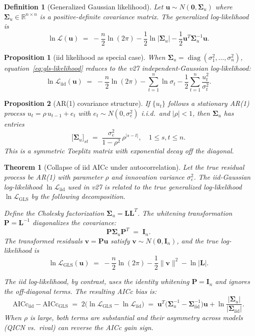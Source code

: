 \documentclass[11pt]{article}
\newtheorem{definition}{Definition}
\newtheorem{proposition}{Proposition}
\newtheorem{theorem}{Theorem}
\begin{document}
\begin{definition}[Generalized Gaussian likelihood]
Let $\bm{u}\sim N(\bm{0},\bm{\Sigma}_u)$ where $\bm{\Sigma}_u\in\mathbb{R}^{n\times n}$ is a positive-definite covariance matrix. The \emph{generalized log-likelihood} is
\begin{equation}\label{eq:gls-likelihood}
\ln\mathcal{L}(\bm{u})\;=\;-\frac{n}{2}\ln(2\pi)-\frac{1}{2}\ln|\bm{\Sigma}_u|-\frac{1}{2}\bm{u}^T\bm{\Sigma}_u^{-1}\bm{u}.
\end{equation}
\end{definition}

\begin{proposition}[iid likelihood as special case]
When $\bm{\Sigma}_u=\operatorname{diag}(\sigma_1^2,\ldots,\sigma_n^2)$, equation~\eqref{eq:gls-likelihood} reduces to the v27 independent-Gaussian log-likelihood:
\[
\ln\mathcal{L}_{\mathrm{iid}}(\bm{u})\;=\;-\frac{n}{2}\ln(2\pi)-\sum_{t=1}^n\ln\sigma_t-\frac{1}{2}\sum_{t=1}^n\frac{u_t^2}{\sigma_t^2}.
\]
\end{proposition}

\begin{proposition}[AR(1) covariance structure]\label{prop:ar1-cov}
If $\{u_t\}$ follows a stationary AR(1) process $u_t=\rho\,u_{t-1}+e_t$ with $e_t\sim N(0,\sigma_e^2)$ i.i.d.\ and $|\rho|<1$, then $\bm{\Sigma}_u$ has entries
\[
\bigl[\bm{\Sigma}_u\bigr]_{st}\;=\;\frac{\sigma_e^2}{1-\rho^2}\,\rho^{|s-t|},\quad 1\leq s,t\leq n.
\]
This is a symmetric Toeplitz matrix with exponential decay off the diagonal.
\end{proposition}

\begin{theorem}[Collapse of iid AICc under autocorrelation]\label{thm:aicc-collapse}
Let the true residual process be AR(1) with parameter $\rho$ and innovation variance $\sigma_e^2$. The iid-Gaussian log-likelihood $\ln\mathcal{L}_{\mathrm{iid}}$ used in v27 is related to the true generalized log-likelihood $\ln\mathcal{L}_{\mathrm{GLS}}$ by the following decomposition.

Define the Cholesky factorization $\bm{\Sigma}_u=\bm{L}\bm{L}^T$. The \emph{whitening transformation} $\bm{P}=\bm{L}^{-1}$ diagonalizes the covariance:
\[
\bm{P}\bm{\Sigma}_u\bm{P}^T\;=\;\bm{I}_n.
\]
The transformed residuals $\bm{v}=\bm{P}\bm{u}$ satisfy $\bm{v}\sim N(\bm{0},\bm{I}_n)$, and the true log-likelihood is
\[
\ln\mathcal{L}_{\mathrm{GLS}}(\bm{u})\;=\;-\frac{n}{2}\ln(2\pi)-\frac{1}{2}\|\bm{v}\|^2-\ln|\bm{L}|.
\]

The iid log-likelihood, by contrast, uses the identity whitening $\bm{P}=\bm{I}_n$ and ignores the off-diagonal terms. The resulting AICc bias is:
\begin{equation}\label{eq:aicc-bias}
\mathrm{AICc}_{\mathrm{iid}}-\mathrm{AICc}_{\mathrm{GLS}}\;=\;2\bigl(\ln\mathcal{L}_{\mathrm{GLS}}-\ln\mathcal{L}_{\mathrm{iid}}\bigr)
\;=\;\bm{u}^T\!\bigl(\bm{\Sigma}_u^{-1}-\bm{\Sigma}_{\mathrm{iid}}^{-1}\bigr)\bm{u}+\ln\frac{|\bm{\Sigma}_u|}{|\bm{\Sigma}_{\mathrm{iid}}|}.
\end{equation}
When $\rho$ is large, both terms are substantial and their asymmetry across models (QICN vs.\ rival) can reverse the AICc gain sign.
\end{theorem}
\end{document}
